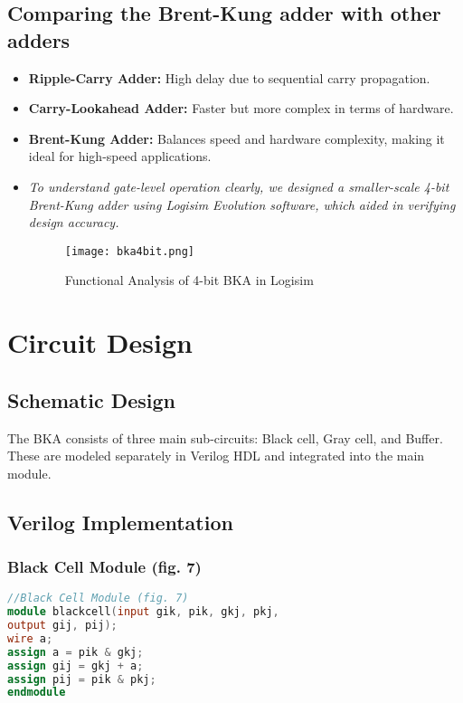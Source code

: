 \documentclass{IEEEtran}
\begin{document}
\subsection{Comparing the Brent-Kung adder with other adders}
\begin{itemize}
\item \textbf{Ripple-Carry Adder:} High delay due to sequential carry propagation.
\item \textbf{Carry-Lookahead Adder:} Faster but more complex in terms of hardware.
\item \textbf{Brent-Kung Adder:} Balances speed and hardware complexity, making it ideal for high-speed applications.
\item \textit{To understand gate-level operation clearly, we designed a smaller-scale 4-bit Brent-Kung adder using Logisim Evolution software, which aided in verifying design accuracy.}
\begin{figure}[H]
    \centering
    \texttt{[image: bka4bit.png]}
    \caption{Functional Analysis of 4-bit BKA in Logisim}
    \label{fig:enter-label}
\end{figure}
\end{itemize}



\section{Circuit Design}

\subsection{Schematic Design}
The BKA consists of three main sub-circuits: Black cell, Gray cell, and Buffer. These are modeled separately in Verilog HDL and integrated into the main module.

\subsection{Verilog Implementation}

\subsubsection{Black Cell Module (fig. 7)}
\begin{lstlisting}[language=Verilog]
//Black Cell Module (fig. 7)
module blackcell(input gik, pik, gkj, pkj, 
output gij, pij);
wire a;
assign a = pik & gkj;
assign gij = gkj + a;
assign pij = pik & pkj;
endmodule
\end{lstlisting}
\end{document}
